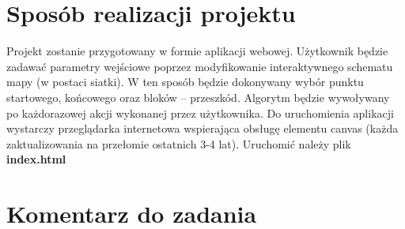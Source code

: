 \documentclass{article}
\begin{document}
\section{Sposób realizacji projektu}
Projekt zostanie przygotowany w formie aplikacji webowej. Użytkownik będzie zadawać parametry wejściowe poprzez modyfikowanie interaktywnego schematu mapy (w postaci siatki). W ten sposób będzie dokonywany wybór punktu startowego, końcowego oraz bloków – przeszkód. Algorytm będzie wywoływany po każdorazowej akcji wykonanej przez użytkownika. 
Do uruchomienia aplikacji wystarczy przeglądarka internetowa wspierająca obsługę elementu canvas (każda zaktualizowania na przełomie ostatnich 3-4 lat). Uruchomić należy plik \textbf{index.html }
\section{Komentarz do zadania} 
\end{document}
